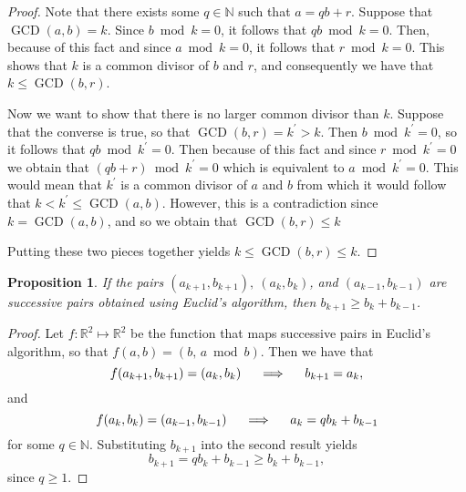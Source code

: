\documentclass{article}
\newtheorem{proposition}{Proposition}
\DeclareMathOperator{\GCD}{GCD}
\begin{document}
\begin{proof}
  Note that there exists some $q \in \mathbb{N}$ such that $a = qb + r$.
  Suppose that $\GCD(a, b) = k$.  Since $b \bmod k = 0$, it follows that
  $qb \bmod k = 0$.  Then, because of this fact and since $a \bmod k = 0$, it
  follows that $r \bmod k = 0$.  This shows that $k$ is a common divisor of $b$
  and $r$, and consequently we have that $k \leq \GCD(b, r)$.

  Now we want to show that there is no larger common divisor than $k$.  Suppose
  that the converse is true, so that $\GCD(b, r) = k^{\prime} > k$.  Then
  $b \bmod k^{\prime} = 0$, so it follows that $qb \bmod k^{\prime} = 0$.  Then
  because of this fact and since $r \bmod k^{\prime} = 0$ we obtain that
  $(qb + r) \bmod k^{\prime} = 0$ which is equivalent to
  $a \bmod k^{\prime} = 0$.  This would mean that $k^{\prime}$ is a common
  divisor of $a$ and $b$ from which it would follow that
  $k < k^{\prime} \leq \GCD(a, b)$.  However, this is a contradiction since
  $k = \GCD(a, b)$, and so we obtain that $\GCD(b, r) \leq k$

  Putting these two pieces together yields $k \leq \GCD(b, r) \leq k$.
\end{proof}
\vspace{5mm}





\begin{proposition}
  \label{thm:bound-for-euclid-bs}
  If the pairs $(a_{k + 1}, b_{k + 1}),~ (a_k, b_k)$, and
  $(a_{k - 1}, b_{k - 1})$ are successive pairs obtained using Euclid's
  algorithm, then $b_{k + 1} \geq b_k + b_{k - 1}$.
\end{proposition}

\begin{proof}
  Let $f: \mathbb{R}^2 \mapsto \mathbb{R}^2$ be the function that maps
  successive pairs in Euclid's algorithm, so that $f(a, b) = (b,\, a \bmod b)$.
  Then we have that
  \begin{equation*}
    f(a_{k + 1}, b_{k + 1}) = (a_k, b_k) \hspace{5mm} \Longrightarrow \hspace{5mm} b_{k + 1} = a_k,
  \end{equation*}
  and
  \begin{equation*}
    f(a_{k}, b_{k}) = (a_{k - 1}, b_{k - 1}) \hspace{5mm} \Longrightarrow \hspace{5mm} a_{k} = qb_{k} + b_{k - 1}
  \end{equation*}
  for some $q \in \mathbb{N}$.  Substituting $b_{k + 1}$ into the second result yields
  \begin{equation*}
    b_{k + 1} = qb_{k} + b_{k - 1} \geq b_{k} + b_{k - 1},
  \end{equation*}
  since $q \geq 1$.
\end{proof}
\end{document}
